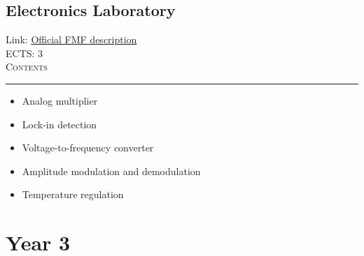 \documentclass[11pt, a4paper]{article}
\newenvironment{course}[3]{
\subsection{#1}%
Link: \href{#2}{Official FMF description}\\%
ECTS: #3%
\vspace{1ex}
\\
{\large \textsc{Contents}}\\[-0.9ex]%
\rule{\textwidth}{0.5pt}
\vspace{-3ex}
}
{}
\newenvironment{chapter}[1]{
\begin{tcolorbox}[title=#1, breakable]
}
{\end{tcolorbox}}
\begin{document}
\begin{course}{Electronics Laboratory}{https://www.fmf.uni-lj.si/en/study-physics/programmes/1fiz/2020/7000777/courses/1136/}{3}
\begin{chapter}{List of labs and projects}
\begin{itemize}
            \item Analog multiplier

            \item Lock-in detection

            \item Voltage-to-frequency converter

            \item Amplitude modulation and demodulation

            \item Temperature regulation
        
        \end{itemize}
        
    \end{chapter}

\end{course}

\newpage
\section{Year 3}
\end{document}
